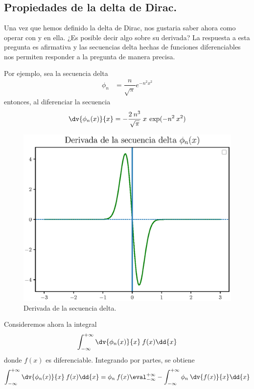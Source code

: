 \subsection{Propiedades de la delta de Dirac.}
Una vez que hemos definido la delta de Dirac, nos gustaria saber ahora como operar con y en ella. ¿Es posible decir algo sobre su derivada? La respuesta a esta pregunta es afirmativa y las secuencias delta hechas de funciones diferenciables nos permiten responder a la pregunta de manera precisa.
\par
Por ejemplo, sea la secuencia delta
\begin{align*}
\phi_{n} &= \dfrac{n}{\sqrt{\pi}} e^{-n^{2} x^{2}}
\end{align*}
entonces, al diferenciar la secuencia
\begin{align*}
\dv{\phi_{n}(x)}{x} = - \dfrac{2 \: n^{3}}{\sqrt{\pi}} \: x \: \exp(-n^{2} \: x^{2})
\end{align*}
\begin{figure}[H]
    \centering
    \includegraphics[scale=0.8]{Imagenes/secuencia_delta_04.eps}
    \caption{Derivada de la secuencia delta.}
    \label{fig:fig_figura_delta_04}
\end{figure}
Consideremos ahora la integral
\begin{align*}
\int_{-\infty}^{+\infty} \dv{\phi_{n}(x)}{x} \: f(x) \dd{x}
\end{align*}
donde $f(x)$ es diferenciable. Integrando por partes, se obtiene
\begin{align*}
\int_{-\infty}^{+\infty} \dv{\phi_{n}(x)}{x} \: f(x) \dd{x} = \phi_{n} \: f(x) \eval_{-\infty}^{+\infty} - \int_{-\infty}^{+\infty} \phi_{n} \: \dv{f(x)}{x} \dd{x}
\end{align*}
